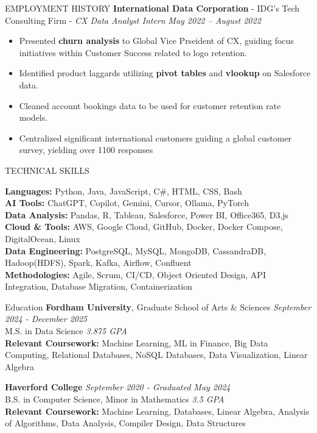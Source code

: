 \documentclass{resume3}
\begin{document}
\begin{rSection}{EMPLOYMENT HISTORY}
{\bf International Data Corporation} - IDG's Tech Consulting Firm - {\em CX Data Analyst Intern} \hfill {\em May 2022 – August 2022} 
\begin{itemize}
\item Presented \textbf{churn analysis} to Global Vice Prseident of CX, guiding focus initiatives within Customer Success related to logo retention.
\item Identified product laggards utilizing \textbf{pivot tables} and \textbf{vlookup} on Salesforce data.
\item Cleaned account bookings data to be used for customer retention rate models.
\item Centralized significant international customers guiding a global customer survey, yielding over 1100 responses
\end{itemize}

\end{rSection}

\begin{rSection}{TECHNICAL SKILLS}

\vspace{0.15cm}
{\bf Languages:} Python, Java, JavaScript, C\#, HTML, CSS, Bash
\\{\bf AI Tools:} ChatGPT, Copilot, Gemini, Cursor, Ollama, PyTorch
\\{\bf Data Analysis:} Pandas, R, Tableau, Salesforce, Power BI, Office365, D3.js
\\{\bf Cloud \& Tools:} AWS, Google Cloud, GitHub, Docker, Docker Compose, DigitalOcean, Linux 
\\{\bf Data Engineering:} PostgreSQL, MySQL, MongoDB, CassandraDB, Hadoop(HDFS), Spark, Kafka, Airflow, Confluent
\\{\bf Methodologies:} Agile, Scrum, CI/CD, Object Oriented Design, API Integration, Database Migration, Containerization

\end{rSection}

\begin{rSection}{Education}
\vspace{0.15cm}
  {\bf Fordham University}, Graduate School of Arts \& Sciences \hfill {\em September 2024 - December 2025} 
  \\M.S. in Data Science \hfill {\em 3.875 GPA}
\\{\bf Relevant Coursework:} Machine Learning, ML in Finance, Big Data Computing, Relational Databases, NoSQL Databases, Data Visualization, Linear Algebra 

\vspace{2cm}

{\bf Haverford College} \hfill {\em September 2020 - Graduated May 2024} 
  \\B.S. in Computer Science, Minor in Mathematics \hfill {\em 3.5 GPA}
\\{\bf Relevant Coursework:} Machine Learning, Databases, Linear Algebra, Analysis of Algorithms, Data Analysis, Compiler Design, Data Structures

\end{rSection}
\end{document}
